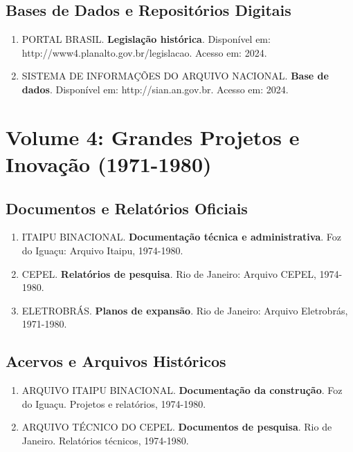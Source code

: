 \documentclass[12pt,a4paper]{report}
\begin{document}
\section*{Bases de Dados e Repositórios Digitais}
\begin{enumerate}[leftmargin=*]
    \item PORTAL BRASIL. \textbf{Legislação histórica}. Disponível em: http://www4.planalto.gov.br/legislacao. Acesso em: 2024.
    
    \item SISTEMA DE INFORMAÇÕES DO ARQUIVO NACIONAL. \textbf{Base de dados}. Disponível em: http://sian.an.gov.br. Acesso em: 2024.
\end{enumerate}

\chapter*{Volume 4: Grandes Projetos e Inovação (1971-1980)}

\section*{Documentos e Relatórios Oficiais}
\begin{enumerate}[leftmargin=*]
    \item ITAIPU BINACIONAL. \textbf{Documentação técnica e administrativa}. Foz do Iguaçu: Arquivo Itaipu, 1974-1980.
    
    \item CEPEL. \textbf{Relatórios de pesquisa}. Rio de Janeiro: Arquivo CEPEL, 1974-1980.
    
    \item ELETROBRÁS. \textbf{Planos de expansão}. Rio de Janeiro: Arquivo Eletrobrás, 1971-1980.
\end{enumerate}

\section*{Acervos e Arquivos Históricos}
\begin{enumerate}[leftmargin=*]
    \item ARQUIVO ITAIPU BINACIONAL. \textbf{Documentação da construção}. Foz do Iguaçu. Projetos e relatórios, 1974-1980.
    
    \item ARQUIVO TÉCNICO DO CEPEL. \textbf{Documentos de pesquisa}. Rio de Janeiro. Relatórios técnicos, 1974-1980.
\end{enumerate}
\end{document}
